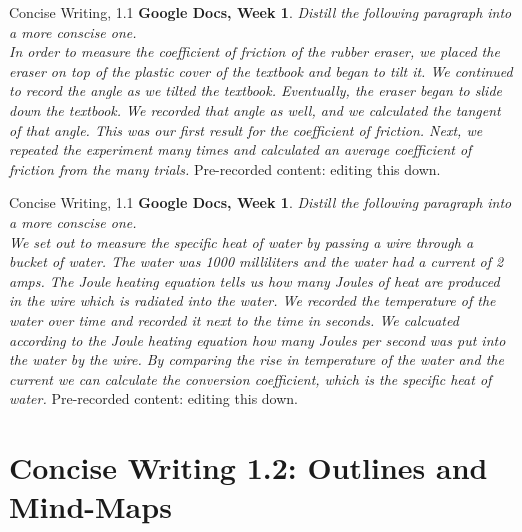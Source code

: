 \documentclass{beamer}
\begin{document}
\begin{frame}{Concise Writing, 1.1}
\textbf{Google Docs, Week 1}. \textit{Distill the following paragraph into a more conscise one.} \\ \vspace{0.25cm}
\textit{In order to measure the coefficient of friction of the rubber eraser, we placed the eraser on top of the plastic cover of the textbook and began to tilt it.  We continued to record the angle as we tilted the textbook.  Eventually, the eraser began to slide down the textbook.  We recorded that angle as well, and we calculated the tangent of that angle.  This was our first result for the coefficient of friction.  Next, we repeated the experiment many times and calculated an average coefficient of friction from the many trials.}
\alert{Pre-recorded content:} editing this down.
\end{frame}

\begin{frame}{Concise Writing, 1.1}
\textbf{Google Docs, Week 1}. \textit{Distill the following paragraph into a more conscise one.} \\ \vspace{0.25cm}
\textit{We set out to measure the specific heat of water by passing a wire through a bucket of water.  The water was 1000 milliliters and the water had a current of 2 amps.  The Joule heating equation tells us how many Joules of heat are produced in the wire which is radiated into the water.  We recorded the temperature of the water over time and recorded it next to the time in seconds.  We calcuated according to the Joule heating equation how many Joules per second was put into the water by the wire.  By comparing the rise in temperature of the water and the current we can calculate the conversion coefficient, which is the specific heat of water.}
\alert{Pre-recorded content:} editing this down.
\end{frame}

\section{Concise Writing 1.2: Outlines and Mind-Maps}
\end{document}
